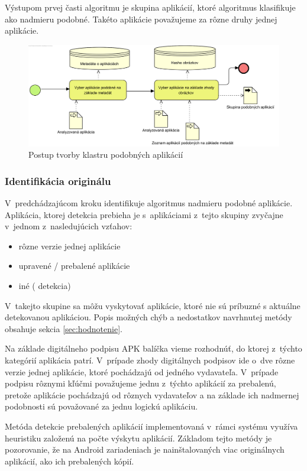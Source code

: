 Výstupom prvej časti algoritmu je skupina aplikácií, ktoré algoritmus klasifikuje ako nadmieru podobné. Takéto aplikácie považujeme za rôzne druhy jednej aplikácie.

\begin{figure}[htb]
  \begin{center}
    \includegraphics[width=130mm]{images/detection-cluster.png}
  \end{center}
  \caption{Postup tvorby klastru podobných aplikácií}
  \label{fig:detectionClustering}
\end{figure}
\subsubsection{\textbf{Identifikácia originálu}} 
V~predchádzajúcom kroku identifikuje algoritmus nadmieru podobné aplikácie. Aplikácia, ktorej detekcia prebieha je s~aplikáciami z~tejto skupiny zvyčajne v~jednom z~nasledujúcich vzťahov:
\begin{itemize}
	\item rôzne verzie jednej aplikácie
	\item upravené / prebalené aplikácie
	\item iné ( detekcia)
\end{itemize}
V~takejto skupine sa môžu vyskytovať aplikácie, ktoré nie sú príbuzné s aktuálne detekovanou aplikáciou. Popis možných chýb a nedostatkov navrhnutej metódy obsahuje sekcia \ref{sec:hodnotenie}.

Na základe digitálneho podpisu APK balíčka vieme rozhodnúť, do ktorej z~týchto kategórií aplikácia patrí. V~prípade zhody digitálnych podpisov ide o~dve rôzne verzie jednej aplikácie, ktoré pochádzajú od jedného vydavateľa. V~prípade podpisu rôznymi kľúčmi považujeme jednu z~týchto aplikácií za prebalenú, pretože aplikácie pochádzajú od rôznych vydavateľov a na základe ich nadmernej podobnosti sú považované za jednu logickú aplikáciu.

Metóda detekcie prebalených aplikácií implementovaná v~rámci systému  využíva heuristiku založenú na počte výskytu aplikácií. Základom tejto metódy je pozorovanie, že na Android zariadeniach je nainštalovaných viac originálnych aplikácií, ako ich prebalených kópií.

